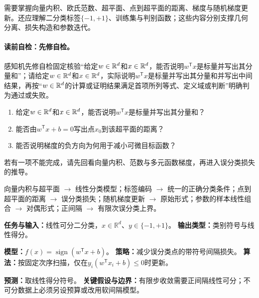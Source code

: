 \label{struct:V2-C01-CH02}
\begin{prerequisitebox}
需要掌握向量内积、欧氏范数、超平面、点到超平面的距离、梯度与随机梯度更新。还应理解二分类标签$\{-1,+1\}$、训练集与判别函数；这些内容分别支撑几何分离、损失构造和参数迭代。
\end{prerequisitebox}

\label{struct:V2-C01-CH03}
\paragraph{读前自检：先修自检。}感知机先修自检固定核验“给定$w\in\mathbb{R}^d$和$x\in\mathbb{R}^d$，能否说明$w^{\mathsf T}x$是标量并写出其分量和”；请给定$w\in\mathbb{R}^d$和$x\in\mathbb{R}^d$，实际说明$w^{\mathsf T}x$是标量并写出其分量和并写出中间结果，再按“$w\in\mathbb{R}^d$的计算或证明结果满足首项所列等式、定义域或判断”明确判为通过或失败。\par

\begin{precheckbox}
\begin{enumerate}[leftmargin=2.2em]
  \item 给定$w\in\mathbb{R}^d$和$x\in\mathbb{R}^d$，能否说明$w^{\mathsf T}x$是标量并写出其分量和？
  \item 能否由$w^{\mathsf T}x+b=0$写出点$x_0$到该超平面的距离？
  \item 能否说明梯度的负方向为何用于减小可微目标函数？
\end{enumerate}
若有一项不能完成，请先回看向量内积、范数与多元函数梯度，再进入误分类损失的推导。
\end{precheckbox}

\label{struct:V2-C01-CH04}
\begin{dependencybox}
向量内积与超平面 $\to$ 线性分类模型；标签编码 $\to$ 统一的正确分类条件；点到超平面的距离 $\to$ 误分类损失；随机梯度更新 $\to$ 原始形式；参数的样本线性组合 $\to$ 对偶形式；正间隔 $\to$ 有限次误分类上界。
\end{dependencybox}

\begin{keypointbox}[title=模型认识卡：感知机]
\textbf{任务与输入：}线性可分二分类，$x\in\mathbb R^d$、$y\in\{-1,+1\}$。\quad
\textbf{输出类型：}类别符号与线性得分。\par
\textbf{模型：}$f(x)=\operatorname{sign}(w^{\mathsf T}x+b)$。\quad
\textbf{策略：}减少误分类点的带符号间隔损失。\quad
\textbf{算法：}按固定次序扫描，仅在$y_i(w^{\mathsf T}x_i+b)\le0$时更新。\par
\textbf{预测：}取线性得分符号。\quad
\textbf{关键假设与边界：}有限步收敛需要正间隔线性可分；不可分数据上必须另设预算或改用软间隔模型。
\end{keypointbox}

